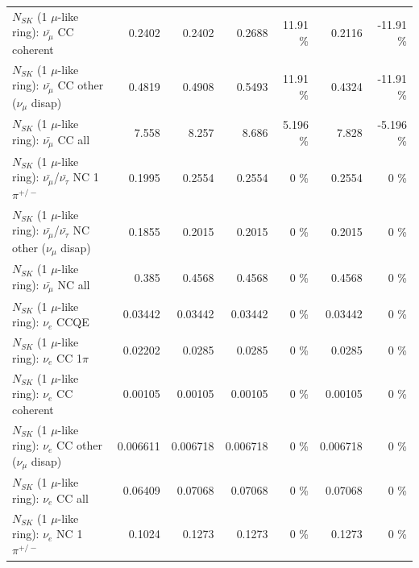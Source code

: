\begin{table}
\begin{tabular}{| l | r | r | r  r | r  r |}
                       $N_{SK}$ (1 $\mu$-like ring): $\bar{\nu_\mu}$ CC coherent &          0.2402 &          0.2402 &          0.2688 &    11.91 \%  &          0.2116 &   -11.91 \%  \\ 
        $N_{SK}$ (1 $\mu$-like ring): $\bar{\nu_\mu}$ CC other ($\nu_\mu$ disap) &          0.4819 &          0.4908 &          0.5493 &    11.91 \%  &          0.4324 &   -11.91 \%  \\ 
                          $N_{SK}$ (1 $\mu$-like ring): $\bar{\nu_{\mu}}$ CC all &           7.558 &           8.257 &           8.686 &    5.196 \%  &           7.828 &   -5.196 \%  \\ 
\hline
  $N_{SK}$ (1 $\mu$-like ring): $\bar{\nu_\mu}$/$\bar{\nu_\tau}$ NC 1$\pi^{+/-}$ &          0.1995 &          0.2554 &          0.2554 &        0 \%  &          0.2554 &        0 \%  \\ 
$N_{SK}$ (1 $\mu$-like ring): $\bar{\nu_\mu}$/$\bar{\nu_\tau}$ NC other ($\nu_\mu$ disap) &          0.1855 &          0.2015 &          0.2015 &        0 \%  &          0.2015 &        0 \%  \\ 
                          $N_{SK}$ (1 $\mu$-like ring): $\bar{\nu_{\mu}}$ NC all &           0.385 &          0.4568 &          0.4568 &        0 \%  &          0.4568 &        0 \%  \\ 
\hline
\hline
\hline
                                      $N_{SK}$ (1 $\mu$-like ring): $\nu_e$ CCQE &         0.03442 &         0.03442 &         0.03442 &        0 \%  &         0.03442 &        0 \%  \\ 
                                 $N_{SK}$ (1 $\mu$-like ring): $\nu_e$ CC 1$\pi$ &         0.02202 &          0.0285 &          0.0285 &        0 \%  &          0.0285 &        0 \%  \\ 
                               $N_{SK}$ (1 $\mu$-like ring): $\nu_e$ CC coherent &         0.00105 &         0.00105 &         0.00105 &        0 \%  &         0.00105 &        0 \%  \\ 
                $N_{SK}$ (1 $\mu$-like ring): $\nu_e$ CC other ($\nu_\mu$ disap) &        0.006611 &        0.006718 &        0.006718 &        0 \%  &        0.006718 &        0 \%  \\ 
                                  $N_{SK}$ (1 $\mu$-like ring): $\nu_{e}$ CC all &         0.06409 &         0.07068 &         0.07068 &        0 \%  &         0.07068 &        0 \%  \\ 
\hline
                           $N_{SK}$ (1 $\mu$-like ring): $\nu_e$ NC 1$\pi^{+/-}$ &          0.1024 &          0.1273 &          0.1273 &        0 \%  &          0.1273 &        0 \%  \\ 

\end{tabular}
\end{table}

